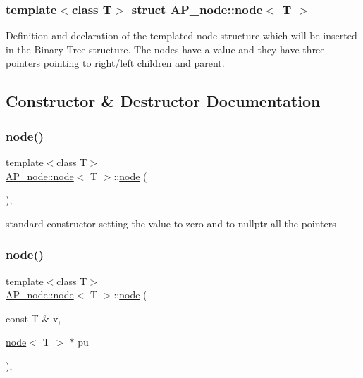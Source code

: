 \subsubsection*{template$<$class T$>$\newline
struct A\+P\+\_\+node\+::node$<$ T $>$}

Definition and declaration of the templated node structure which will be inserted in the Binary Tree structure. The nodes have a value and they have three pointers pointing to right/left children and parent. 

\subsection{Constructor \& Destructor Documentation}
\mbox{\label{structAP__node_1_1node_aacecb07aeda049c5b310c6178fd024dc}} 
\subsubsection{\texorpdfstring{node()}{node()}\hspace{0.1cm}{\footnotesize\ttfamily [1/3]}}
{\footnotesize\ttfamily template$<$class T$>$ \\
\hyperlink{structAP__node_1_1node}{A\+P\+\_\+node\+::node}$<$ T $>$\+::\hyperlink{structAP__node_1_1node}{node} (\begin{DoxyParamCaption}{ }\end{DoxyParamCaption})\hspace{0.3cm}{\ttfamily [inline]}, {\ttfamily [noexcept]}}

standard constructor setting the value to zero and to nullptr all the pointers \mbox{\label{structAP__node_1_1node_a364c333ccf25b7f1c4ac766a23e86ee6}} 
\subsubsection{\texorpdfstring{node()}{node()}\hspace{0.1cm}{\footnotesize\ttfamily [2/3]}}
{\footnotesize\ttfamily template$<$class T$>$ \\
\hyperlink{structAP__node_1_1node}{A\+P\+\_\+node\+::node}$<$ T $>$\+::\hyperlink{structAP__node_1_1node}{node} (\begin{DoxyParamCaption}\item[{const T \&}]{v,  }\item[{\hyperlink{structAP__node_1_1node}{node}$<$ T $>$ $\ast$}]{pu }\end{DoxyParamCaption})\hspace{0.3cm}{\ttfamily [inline]}, {\ttfamily [noexcept]}}

